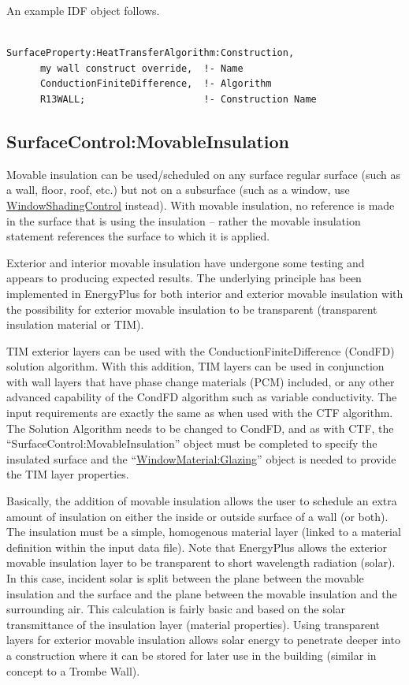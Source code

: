 An example IDF object follows.

\begin{lstlisting}

SurfaceProperty:HeatTransferAlgorithm:Construction,
      my wall construct override,  !- Name
      ConductionFiniteDifference,  !- Algorithm
      R13WALL;                     !- Construction Name
\end{lstlisting}

\subsection{SurfaceControl:MovableInsulation}\label{surfacecontrolmovableinsulation}

Movable insulation can be used/scheduled on any surface regular surface (such as a wall, floor, roof, etc.) but not on a subsurface (such as a window, use \hyperref[windowpropertyshadingcontrol]{WindowShadingControl} instead). With movable insulation, no reference is made in the surface that is using the insulation -- rather the movable insulation statement references the surface to which it is applied.

Exterior and interior movable insulation have undergone some testing and appears to producing expected results. The underlying principle has been implemented in EnergyPlus for both interior and exterior movable insulation with the possibility for exterior movable insulation to be transparent (transparent insulation material or TIM).

TIM exterior layers can be used with the ConductionFiniteDifference (CondFD) solution algorithm. With this addition, TIM layers can be used in conjunction with wall layers that have phase change materials (PCM) included, or any other advanced capability of the CondFD algorithm such as variable conductivity. The input requirements are exactly the same as when used with the CTF algorithm. The Solution Algorithm needs to be changed to CondFD, and as with CTF, the ``SurfaceControl:MovableInsulation'' object must be completed to specify the insulated surface and the ``\hyperref[windowmaterialglazing]{WindowMaterial:Glazing}'' object is needed to provide the TIM layer properties.

Basically, the addition of movable insulation allows the user to schedule an extra amount of insulation on either the inside or outside surface of a wall (or both). The insulation must be a simple, homogenous material layer (linked to a material definition within the input data file). Note that EnergyPlus allows the exterior movable insulation layer to be transparent to short wavelength radiation (solar). In this case, incident solar is split between the plane between the movable insulation and the surface and the plane between the movable insulation and the surrounding air. This calculation is fairly basic and based on the solar transmittance of the insulation layer (material properties). Using transparent layers for exterior movable insulation allows solar energy to penetrate deeper into a construction where it can be stored for later use in the building (similar in concept to a Trombe Wall).

